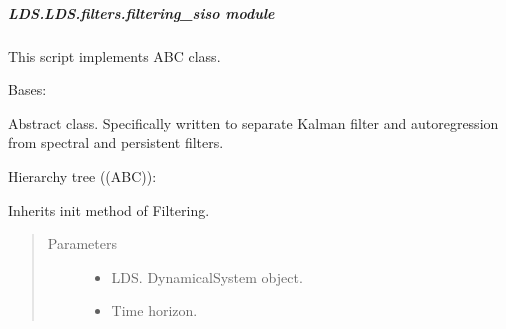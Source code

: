 \documentclass[letterpaper,10pt,english]{sphinxmanual}
\begin{document}
\subparagraph{LDS.LDS.filters.filtering\_siso module}
\label{\detokenize{LDS.LDS.filters:module-LDS.LDS.filters.filtering_siso}}\label{\detokenize{LDS.LDS.filters:lds-lds-filters-filtering-siso-module}}
\sphinxAtStartPar
This script implements ABC class.

\begin{fulllineitems}
\label{\detokenize{LDS.LDS.filters:LDS.LDS.filters.filtering_siso.FilteringSiso}}
\sphinxAtStartPar
Bases: {\hyperref[\detokenize{LDS.LDS.filters:LDS.LDS.filters.filtering_abc_class.Filtering}]{}}

\sphinxAtStartPar
Abstract class.
Specifically written to separate Kalman filter and auto\sphinxhyphen{}regression from spectral and
persistent filters.

\sphinxAtStartPar
Hierarchy tree ((ABC)):

\noindent{}

\sphinxAtStartPar
Inherits init method of Filtering.
\begin{quote}\begin{description}
\item[{Parameters}] \leavevmode\begin{itemize}
\item {} 
\sphinxAtStartPar
{} \textendash{} LDS. DynamicalSystem object.

\item {} 
\sphinxAtStartPar
{} \textendash{} Time horizon.

\end{itemize}

\end{description}\end{quote}


\end{fulllineitems}
\end{document}
